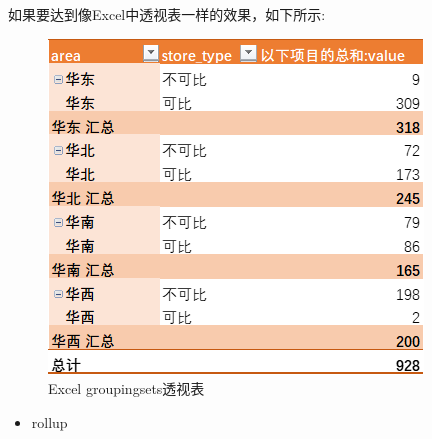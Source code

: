 \documentclass[
]{book}
\providecommand{\tightlist}{%
  \setlength{\itemsep}{0pt}\setlength{\parskip}{0pt}}
\begin{document}
如果要达到像Excel中透视表一样的效果，如下所示:

\begin{figure}
\centering
\includegraphics{./picture/data-table/Excel-pivot-groupingsets.png}
\caption{Excel groupingsets透视表}
\end{figure}

\begin{itemize}
\tightlist
\item
  rollup
\end{itemize}
\end{document}
